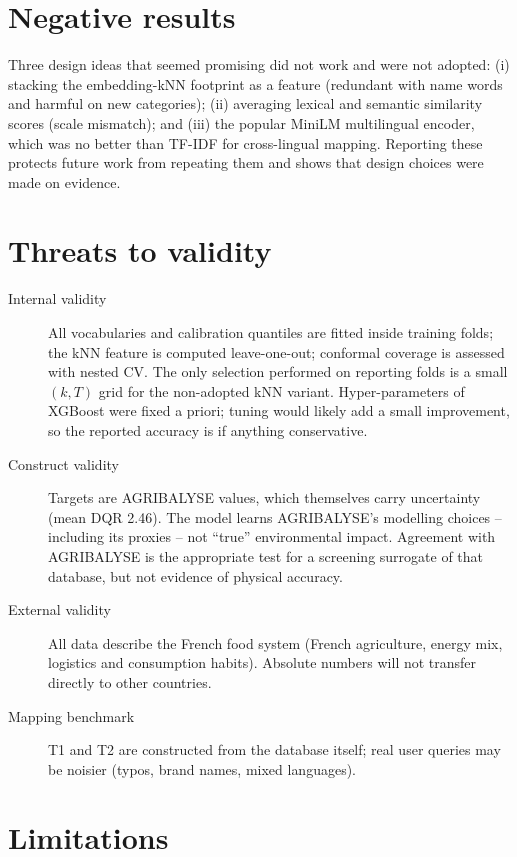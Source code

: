 \section{Negative results}

Three design ideas that seemed promising did not work and were not adopted:
(i) stacking the embedding-kNN footprint as a feature (redundant with name words and harmful on new
categories); (ii) averaging lexical and semantic similarity scores (scale mismatch); and (iii) the
popular MiniLM multilingual encoder, which was no better than TF-IDF for cross-lingual mapping.
Reporting these protects future work from repeating them and shows that design choices were made on
evidence.

\section{Threats to validity}

\begin{description}
  \item[Internal validity] All vocabularies and calibration quantiles are fitted inside training
  folds; the kNN feature is computed leave-one-out; conformal coverage is assessed with nested CV.
  The only selection performed on reporting folds is a small $(k,T)$ grid for the non-adopted kNN
  variant. Hyper-parameters of XGBoost were fixed a priori; tuning would likely add a small
  improvement, so the reported accuracy is if anything conservative.
  \item[Construct validity] Targets are AGRIBALYSE values, which themselves carry uncertainty (mean
  DQR 2.46). The model learns AGRIBALYSE's modelling choices -- including its proxies -- not ``true''
  environmental impact. Agreement with AGRIBALYSE is the appropriate test for a screening surrogate
  of that database, but not evidence of physical accuracy.
  \item[External validity] All data describe the French food system (French agriculture, energy mix,
  logistics and consumption habits). Absolute numbers will not transfer directly to other countries.
  \item[Mapping benchmark] T1 and T2 are constructed from the database itself; real user queries
  may be noisier (typos, brand names, mixed languages).
\end{description}

\section{Limitations}

